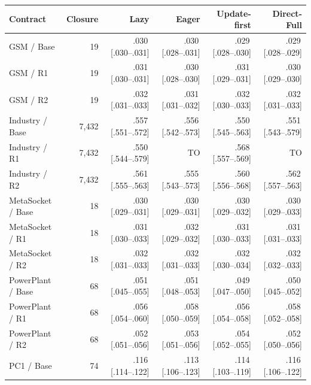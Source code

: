 \begingroup\footnotesize\setlength{\tabcolsep}{3pt}
\newcommand{\PrepTime}[3]{#1\,{\scriptsize[#2--#3]}}
\begin{tabular}{@{}lrrrrr@{}}\toprule
Contract & Closure & Lazy & Eager & Update-first & Direct-Full\\\midrule
GSM / Base & 19 & \PrepTime{.030}{.030}{.031} & \PrepTime{.030}{.028}{.031} & \PrepTime{.029}{.028}{.030} & \PrepTime{.029}{.028}{.029}\\
GSM / R1 & 19 & \PrepTime{.031}{.030}{.031} & \PrepTime{.030}{.028}{.030} & \PrepTime{.031}{.029}{.031} & \PrepTime{.030}{.029}{.030}\\
GSM / R2 & 19 & \PrepTime{.032}{.031}{.033} & \PrepTime{.031}{.031}{.032} & \PrepTime{.032}{.030}{.033} & \PrepTime{.032}{.031}{.033}\\
\addlinespace[3pt]
Industry / Base & 7,432 & \PrepTime{.557}{.551}{.572} & \PrepTime{.556}{.542}{.573} & \PrepTime{.550}{.545}{.563} & \PrepTime{.551}{.543}{.579}\\
Industry / R1 & 7,432 & \PrepTime{.550}{.544}{.579} & TO & \PrepTime{.568}{.557}{.569} & TO\\
Industry / R2 & 7,432 & \PrepTime{.561}{.555}{.563} & \PrepTime{.555}{.543}{.573} & \PrepTime{.560}{.556}{.568} & \PrepTime{.562}{.557}{.563}\\
\addlinespace[3pt]
MetaSocket / Base & 18 & \PrepTime{.030}{.029}{.031} & \PrepTime{.030}{.029}{.031} & \PrepTime{.030}{.029}{.032} & \PrepTime{.030}{.029}{.033}\\
MetaSocket / R1 & 18 & \PrepTime{.031}{.030}{.033} & \PrepTime{.032}{.029}{.032} & \PrepTime{.031}{.030}{.033} & \PrepTime{.031}{.031}{.033}\\
MetaSocket / R2 & 18 & \PrepTime{.032}{.031}{.033} & \PrepTime{.032}{.031}{.033} & \PrepTime{.032}{.030}{.034} & \PrepTime{.032}{.032}{.033}\\
\addlinespace[3pt]
PowerPlant / Base & 68 & \PrepTime{.051}{.045}{.055} & \PrepTime{.051}{.048}{.053} & \PrepTime{.049}{.047}{.050} & \PrepTime{.050}{.045}{.052}\\
PowerPlant / R1 & 68 & \PrepTime{.056}{.054}{.060} & \PrepTime{.058}{.050}{.059} & \PrepTime{.056}{.054}{.058} & \PrepTime{.058}{.052}{.058}\\
PowerPlant / R2 & 68 & \PrepTime{.052}{.051}{.056} & \PrepTime{.053}{.051}{.056} & \PrepTime{.054}{.052}{.055} & \PrepTime{.052}{.050}{.056}\\
\addlinespace[3pt]
PC1 / Base & 74 & \PrepTime{.116}{.114}{.122} & \PrepTime{.113}{.106}{.123} & \PrepTime{.114}{.103}{.119} & \PrepTime{.116}{.106}{.122}\\

\end{tabular}
